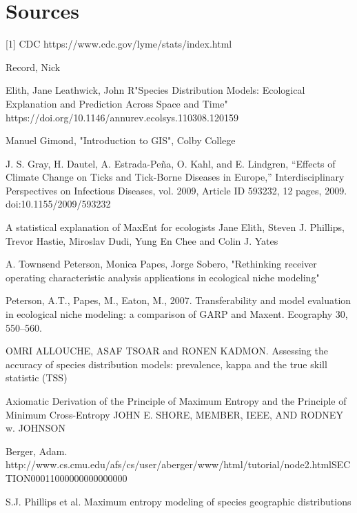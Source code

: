 
\chapter{Sources} %
[1] CDC https://www.cdc.gov/lyme/stats/index.html \newline

\noindent [2] Record, Nick \newline

\noindent [3] Elith, Jane Leathwick, John R"Species Distribution Models: Ecological Explanation and Prediction Across Space and Time" https://doi.org/10.1146/annurev.ecolsys.110308.120159\newline

\noindent [4] Manuel Gimond, "Introduction to GIS", Colby College \newline

\noindent [5] J. S. Gray, H. Dautel, A. Estrada-Peña, O. Kahl, and E. Lindgren, “Effects of Climate Change on Ticks and Tick-Borne Diseases in Europe,” Interdisciplinary Perspectives on Infectious Diseases, vol. 2009, Article ID 593232, 12 pages, 2009. doi:10.1155/2009/593232\newline

\noindent [6] A statistical explanation of MaxEnt for ecologists Jane Elith, Steven J. Phillips, Trevor Hastie, Miroslav Dudi, Yung En Chee and Colin J. Yates\newline

\noindent [7] A. Townsend Peterson, Monica Papes, Jorge Sobero, "Rethinking receiver operating characteristic analysis applications in ecological niche modeling" \newline

\noindent [8] Peterson, A.T., Papes, M., Eaton, M., 2007. Transferability and model evaluation in ecological niche modeling: a comparison of GARP and Maxent. Ecography 30, 550–560. \newline

\noindent [9] OMRI ALLOUCHE, ASAF TSOAR and RONEN KADMON. Assessing the accuracy of species distribution models: prevalence, kappa and the true skill statistic (TSS) \newline

\noindent [10]  Axiomatic Derivation of the Principle of Maximum Entropy and the Principle of Minimum Cross-Entropy JOHN E. SHORE, MEMBER, IEEE, AND RODNEY w. JOHNSON \newline

\noindent [11] Berger, Adam. http://www.cs.cmu.edu/afs/cs/user/aberger/www/html/tutorial/node2.htmlSECTION00011000000000000000 \newline

\noindent [12] S.J. Phillips et al. Maximum entropy modeling of species geographic distributions \newline


